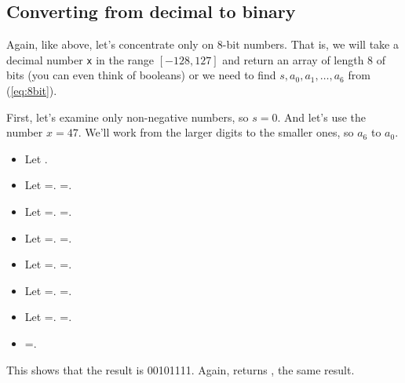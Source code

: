 \subsection{Converting from decimal to binary}

Again, like above, let's concentrate only on 8-bit numbers.  That is, we will take a decimal number \verb!x! in the range $[-128,127]$ and return an array of length 8 of bits (you can even think of booleans) or we need to find $s, a_0,a_1,\ldots,a_6$ from (\ref{eq:8bit}). 

First, let's examine only non-negative numbers, so $s=0$. And let's use the number $x=47$.  We'll work from the larger digits to the smaller ones, so $a_6$ to $a_0$. 

\begin{itemize}
\item Let . 
\item  Let =\printpythontex[verb].  
=\printpythontex[verb].

\item  Let =\printpythontex[verb]. 
=\printpythontex[verb].

\item  Let =\printpythontex[verb]. 
=\printpythontex[verb].

\item  Let =\printpythontex[verb]. 
=\printpythontex[verb].

\item  Let =\printpythontex[verb]. 
=\printpythontex[verb].

\item  Let =\printpythontex[verb]. 
=\printpythontex[verb].
\item {}=\printpythontex[verb]. 
\end{itemize}

This shows that the result is 00101111.  Again,  returns \printpythontex[verb], the same result.  


